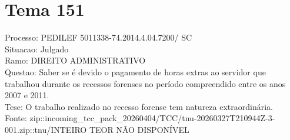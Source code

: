 \documentclass[12pt]{article}
\begin{document}
\section*{Tema 151}
Processo: PEDILEF 5011338-74.2014.4.04.7200/ SC\\
Situacao: Julgado\\
Ramo: DIREITO ADMINISTRATIVO\\
Questao: Saber se é devido o pagamento de horas extras ao servidor que trabalhou durante os recessos forenses no período compreendido entre os anos 2007 e 2011.\\
Tese: O trabalho realizado no recesso forense tem natureza extraordinária.\\
Fonte: zip::incoming\_tcc\_pack\_20260404/TCC/tnu-20260327T210944Z-3-001.zip::tnu/INTEIRO TEOR NÃO DISPONÍVEL
\end{document}
